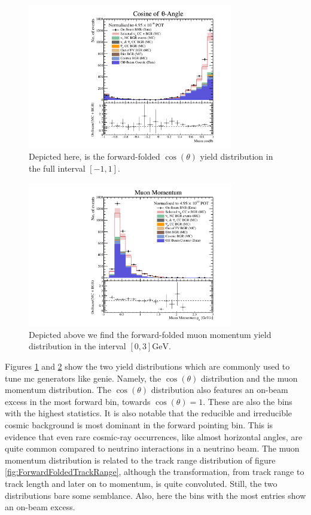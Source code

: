 \begin{figure}[htbp]
    \centering
    \includegraphics[width=0.8\textwidth]{images/FirstCCInclusive/Kinematic/ForwardFoldedCosTheta.pdf}
    \caption[Forward-Folded $\cos{(\theta)}$ Distribution]{Depicted here, is the forward-folded $\cos{(\theta)}$ yield distribution in the full interval $[-1,1]$.}
    \label{fig:ForwardFoldedCosTheta}
\end{figure}
\begin{figure}[htbp]
    \centering
    \includegraphics[width=0.8\textwidth]{images/FirstCCInclusive/Kinematic/ForwardFoldedMomentum.pdf}
    \caption[Forward-Folded Muon Momentum Distribution]{Depicted above we find the forward-folded muon momentum yield distribution in the interval $[0,3] \si{\giga\electronvolt}$.}
    \label{fig:ForwardFoldedMomentum}
\end{figure}
Figures \ref{fig:ForwardFoldedCosTheta} and \ref{fig:ForwardFoldedMomentum} show the two yield distributions which are commonly used to tune \gls{mc} generators like \gls{genie}. Namely, the $\cos{(\theta)}$ distribution and the muon momentum distribution. The $\cos{(\theta)}$ distribution also features an on-beam excess in the most forward bin, \ie towards $\cos{(\theta)} = 1$. These are also the bins with the highest statistics. It is also notable that the reducible and irreducible cosmic background is most dominant in the forward pointing bin. This is evidence that even rare cosmic-ray occurrences, like almost horizontal angles, are quite common compared to neutrino interactions in a neutrino beam. The muon momentum distribution is related to the track range distribution of figure \ref{fig:ForwardFoldedTrackRange}, although the transformation, from track range to track length and later on to momentum, is quite convoluted. Still, the two distributions bare some semblance. Also, here the bins with the most entries show an on-beam excess. 
